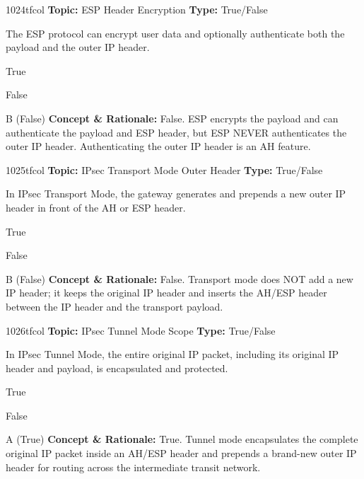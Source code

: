 \begin{qcard}{1024}{tfcol}
\textcolor{darkslate!75}{\small\textbf{Topic:} ESP Header Encryption \hfill \textbf{Type:} True/False}\vspace{0.4em}\par
The ESP protocol can encrypt user data and optionally authenticate both the payload and the outer IP header.
\begin{qoptions}
\item True
\item False
\end{qoptions}
\end{qcard}
\nopagebreak
\begin{explainbox}{B (False)}
\textbf{Concept \& Rationale:} False. ESP encrypts the payload and can authenticate the payload and ESP header, but ESP NEVER authenticates the outer IP header. Authenticating the outer IP header is an AH feature.
\end{explainbox}

\begin{qcard}{1025}{tfcol}
\textcolor{darkslate!75}{\small\textbf{Topic:} IPsec Transport Mode Outer Header \hfill \textbf{Type:} True/False}\vspace{0.4em}\par
In IPsec Transport Mode, the gateway generates and prepends a new outer IP header in front of the AH or ESP header.
\begin{qoptions}
\item True
\item False
\end{qoptions}
\end{qcard}
\nopagebreak
\begin{explainbox}{B (False)}
\textbf{Concept \& Rationale:} False. Transport mode does NOT add a new IP header; it keeps the original IP header and inserts the AH/ESP header between the IP header and the transport payload.
\end{explainbox}

\begin{qcard}{1026}{tfcol}
\textcolor{darkslate!75}{\small\textbf{Topic:} IPsec Tunnel Mode Scope \hfill \textbf{Type:} True/False}\vspace{0.4em}\par
In IPsec Tunnel Mode, the entire original IP packet, including its original IP header and payload, is encapsulated and protected.
\begin{qoptions}
\item True
\item False
\end{qoptions}
\end{qcard}
\nopagebreak
\begin{explainbox}{A (True)}
\textbf{Concept \& Rationale:} True. Tunnel mode encapsulates the complete original IP packet inside an AH/ESP header and prepends a brand-new outer IP header for routing across the intermediate transit network.
\end{explainbox}

